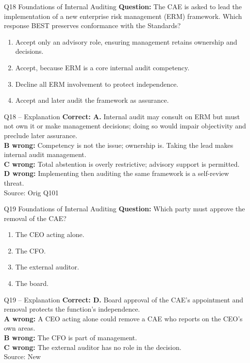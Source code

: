 \documentclass[aspectratio=169,10pt]{beamer}
\begin{document}
\begin{frame}[t]{Q18 \hfill {\scriptsize Foundations of Internal Auditing}}
	\small
	\textbf{Question:} The CAE is asked to lead the implementation of a new enterprise risk management (ERM) framework. Which response BEST preserves conformance with the Standards?
	\begin{enumerate}[label=\Alph*.,itemsep=1pt,topsep=3pt]
			\item Accept only an advisory role, ensuring management retains ownership and decisions.
			\item Accept, because ERM is a core internal audit competency.
			\item Decline all ERM involvement to protect independence.
			\item Accept and later audit the framework as assurance.
	\end{enumerate}
\end{frame}

\begin{frame}[t]{Q18 -- Explanation}
	\footnotesize
	\textbf{Correct: A.} Internal audit may consult on ERM but must not own it or make management decisions; doing so would impair objectivity and preclude later assurance. \\[5pt]
\textbf{B wrong:} Competency is not the issue; ownership is. Taking the lead makes internal audit management. \\[3pt]
\textbf{C wrong:} Total abstention is overly restrictive; advisory support is permitted. \\[3pt]
\textbf{D wrong:} Implementing then auditing the same framework is a self-review threat. \\[3pt]
	\vfill {\tiny Source: Orig Q101}
\end{frame}

\begin{frame}[t]{Q19 \hfill {\scriptsize Foundations of Internal Auditing}}
	\small
	\textbf{Question:} Which party must approve the removal of the CAE?
	\begin{enumerate}[label=\Alph*.,itemsep=1pt,topsep=3pt]
			\item The CEO acting alone.
			\item The CFO.
			\item The external auditor.
			\item The board.
	\end{enumerate}
\end{frame}

\begin{frame}[t]{Q19 -- Explanation}
	\footnotesize
	\textbf{Correct: D.} Board approval of the CAE's appointment and removal protects the function's independence. \\[5pt]
\textbf{A wrong:} A CEO acting alone could remove a CAE who reports on the CEO's own areas. \\[3pt]
\textbf{B wrong:} The CFO is part of management. \\[3pt]
\textbf{C wrong:} The external auditor has no role in the decision. \\[3pt]
	\vfill {\tiny Source: New}
\end{frame}
\end{document}
